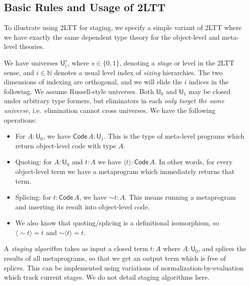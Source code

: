 \documentclass[11pt,a4paper,twoside]{article}
\newcommand{\U}{\mathsf{U}}
\newcommand{\Code}{\mathsf{Code}}
\newcommand{\qtm}[1]{\langle #1\rangle}
\begin{document}
\subsection*{Basic Rules and Usage of 2LTT}

To illustrate using 2LTT for staging, we specify a simple variant of 2LTT where
we have exactly the same dependent type theory for the object-level and
meta-level theories.

We have universes $\U^s_{i}$, where $s \in \{0,1\}$, denoting a \emph{stage} or
level in the 2LTT sense, and $i \in \mathbb{N}$ denotes a usual level index of
\emph{sizing} hierarchies. The two dimensions of indexing are orthogonal, and we
will elide the $i$ indices in the following. We assume Russell-style universes.
Both $\U_0$ and $\U_1$ may be closed under arbitrary type formers, but
eliminators in each \emph{only target the same universe}, i.e.\ elimination
cannot cross universes. We have the following operations:
\begin{itemize}
\item
  For $A : \U_0$, we have $\Code\,A : \U_1$. This is the type of meta-level
  programs which return object-level code with type $A$.
\item
  Quoting: for $A : \U_0$ and $t : A$ we have $\qtm{t} : \Code\,A$. In other
  words, for every object-level term we have a metaprogram which immediately
  returns that term.
\item Splicing: for $t : \Code\,A$, we have $\sim\!t : A$. This means running
  a metaprogram and inserting its result into object-level code.
\item We also know that quoting/splicing is a definitional isomorphism, so
  $\qtm{\sim\!t} = t$ and  $\sim\!\qtm{t} = t$.
\end{itemize}

A \emph{staging algorithm} takes as input a closed term $t : A$ where $A :
\U_0$, and splices the results of all metaprograms, so that we get an output
term which is free of splices. This can be implemented using variations of
normalization-by-evaluation \cite{abel2013normalization} which track current
stages. We do not detail staging algorithms here.
\end{document}
